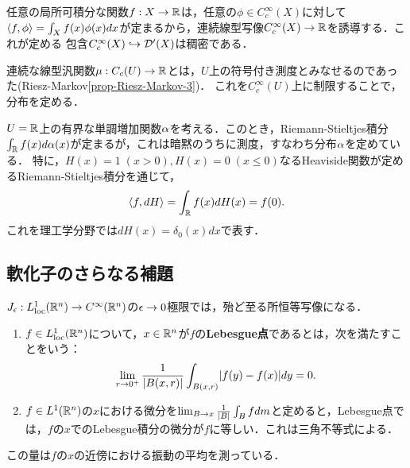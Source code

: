 \documentclass[uplatex,dvipdfmx]{jsreport}
\begin{document}
\begin{example}
    任意の局所可積分な関数$f:X\to\mathbb{R}$は，任意の$\phi\in C_c^\infty(X)$に対して
    $\langle f,\phi\rangle=\int_Xf(x)\phi(x)dx$が定まるから，連続線型写像$C_c^\infty(X)\to\mathbb{R}$を誘導する．これが定める
    包含$C_c^\infty(X)\hookrightarrow\mathcal{D}'(X)$は稠密である．
\end{example}

\begin{example}
    連続な線型汎関数$\mu:C_c(U)\to\mathbb{R}$とは，$U$上の符号付き測度とみなせるのであった(Riesz-Markov\ref{prop-Riesz-Markov-3})．
    これを$C_c^\infty(U)$上に制限することで，分布を定める．
\end{example}

\begin{example}[累積分布関数の消息]
    $U=\mathbb{R}$上の有界な単調増加関数$\alpha$を考える．このとき，Riemann-Stieltjes積分$\int_{\mathbb{R}} f(x)d\alpha(x)$が定まるが，これは暗黙のうちに測度，すなわち分布$\alpha$を定めている．
    特に，$H(x)=1\;(x>0),H(x)=0\;(x\le0)$なるHeaviside関数が定めるRiemann-Stieltjes積分を通じて，
    \[\langle f,dH\rangle=\int_{\mathbb{R}} f(x)dH(x)=f(0).\]
    これを理工学分野では$dH(x)=\delta_0(x)dx$で表す．
\end{example}

\subsection{軟化子のさらなる補題}

\begin{tcolorbox}[colframe=ForestGreen, colback=ForestGreen!10!white,breakable,colbacktitle=ForestGreen!40!white,coltitle=black,fonttitle=\bfseries\sffamily,
title=]
    $J_\epsilon:L^1_{\mathrm{loc}}(\mathbb{R}^n)\to C^\infty(\mathbb{R}^n)$の$\epsilon\to0$極限では，殆ど至る所恒等写像になる．
\end{tcolorbox}

\begin{definition}\mbox{}
    \begin{enumerate}
        \item $f\in L^1_{\mathrm{loc}}(\mathbb{R}^n)$について，$x\in\mathbb{R}^n$が$f$の\textbf{Lebesgue点}であるとは，次を満たすことをいう：
        \[\lim_{r\to0^+}\frac{1}{\lvert B(x,r)\rvert}\int_{B(x,r)}\lvert f(y)-f(x)\rvert dy=0.\]
        \item $f\in L^1(\mathbb{R}^n)$の$x$における微分を$\lim_{B\to x}\frac{1}{\lvert B\rvert}\int_Bfdm$と定めると，Lebesgue点では，$f$の$x$でのLebesgue積分の微分が$f$に等しい．これは三角不等式による．
    \end{enumerate}
\end{definition}
\begin{remarks}
    この量は$f$の$x$の近傍における振動の平均を測っている．
\end{remarks}
\end{document}
